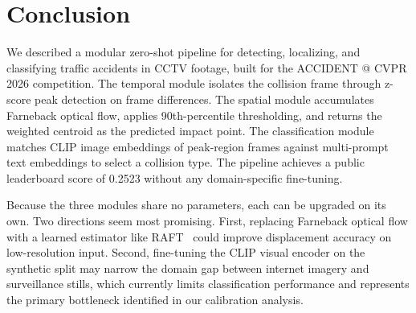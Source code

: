 \section{Conclusion}
\label{sec:conclusion}

We described a modular zero-shot pipeline for detecting, localizing, and classifying traffic accidents in CCTV footage, built for the ACCIDENT @ CVPR 2026 competition. The temporal module isolates the collision frame through z-score peak detection on frame differences. The spatial module accumulates Farneback optical flow, applies 90th-percentile thresholding, and returns the weighted centroid as the predicted impact point. The classification module matches CLIP image embeddings of peak-region frames against multi-prompt text embeddings to select a collision type. The pipeline achieves a public leaderboard score of 0.2523 without any domain-specific fine-tuning.

Because the three modules share no parameters, each can be upgraded on its own. Two directions seem most promising. First, replacing Farneback optical flow with a learned estimator like RAFT~\cite{teed2020raft} could improve displacement accuracy on low-resolution input. Second, fine-tuning the CLIP visual encoder on the synthetic split may narrow the domain gap between internet imagery and surveillance stills, which currently limits classification performance and represents the primary bottleneck identified in our calibration analysis.
